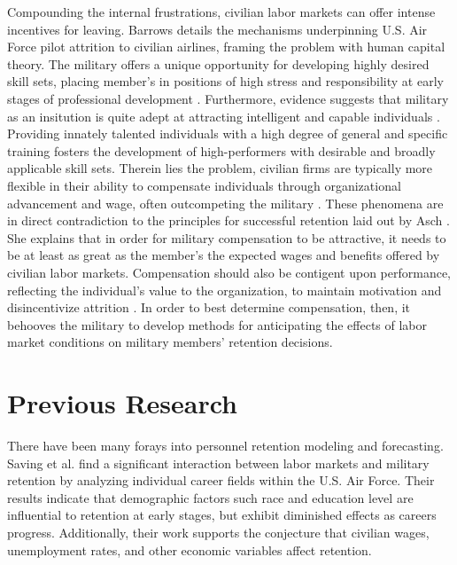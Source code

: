 \documentclass[12pt,letterpaper,toc=flat,oneside]{report}
\theoremstyle{definition}
\theoremstyle{definition}
\theoremstyle{definition}
\theoremstyle{remark}
\begin{document}
Compounding the internal frustrations, civilian labor markets can offer
intense incentives for leaving. Barrows \cite{barrows-1993} details the
mechanisms underpinning U.S. Air Force pilot attrition to civilian
airlines, framing the problem with human capital theory. The military
offers a unique opportunity for developing highly desired skill sets,
placing member's in positions of high stress and responsibility at early
stages of professional development \cite{kane-2012}. Furthermore,
evidence suggests that military as an insitution is quite adept at
attracting intelligent and capable individuals \cite{asch-hosek-2004}.
Providing innately talented individuals with a high degree of general
and specific training fosters the development of high-performers with
desirable and broadly applicable skill sets. Therein lies the problem,
civilian firms are typically more flexible in their ability to
compensate individuals through organizational advancement and wage,
often outcompeting the military \cite{kane-2012}. These phenomena are in
direct contradiction to the principles for successful retention laid out
by Asch \cite{asch-1993}. She explains that in order for military
compensation to be attractive, it needs to be at least as great as the
member's the expected wages and benefits offered by civilian labor
markets. Compensation should also be contigent upon performance,
reflecting the individual's value to the organization, to maintain
motivation and disincentivize attrition \cite{asch-1993}. In order to
best determine compensation, then, it behooves the military to develop
methods for anticipating the effects of labor market conditions on
military members' retention decisions.

\hypertarget{previous-research}{%
\section{Previous Research}\label{previous-research}}

There have been many forays into personnel retention modeling and
forecasting. Saving et al. \cite{saving-etal-1985} find a significant
interaction between labor markets and military retention by analyzing
individual career fields within the U.S. Air Force. Their results
indicate that demographic factors such race and education level are
influential to retention at early stages, but exhibit diminished effects
as careers progress. Additionally, their work supports the conjecture
that civilian wages, unemployment rates, and other economic variables
affect retention.
\end{document}
